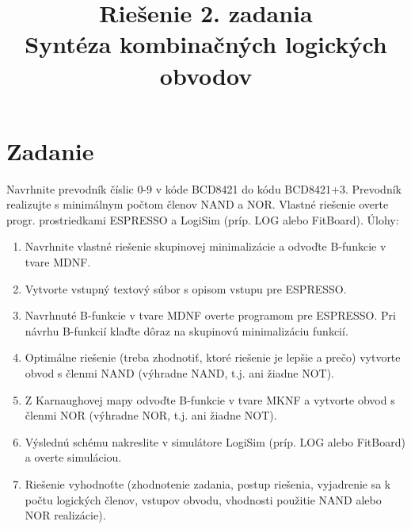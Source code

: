 \documentclass{article}
\author{}
\date{}
\title{Riešenie 2. zadania\\Syntéza kombinačných logických obvodov}
\begin{document}
\maketitle
\thispagestyle{fancy}
\section{Zadanie}
Navrhnite prevodník číslic  0-9 v kóde BCD8421 do kódu BCD8421+3. Prevodník realizujte s 
minimálnym počtom členov NAND a NOR. Vlastné  riešenie overte  progr. prostriedkami ESPRESSO a 
LogiSim (príp. LOG alebo FitBoard). 
Úlohy:
\begin{enumerate}
\item Navrhnite vlastné riešenie skupinovej minimalizácie
 a odvoďte B-funkcie v tvare MDNF.
\item Vytvorte vstupný textový súbor s opisom vstupu pre ESPRESSO.
\item Navrhnuté B-funkcie v tvare MDNF overte programom pre ESPRESSO. Pri návrhu 
B-funkcií klaďte dôraz na skupinovú minimalizáciu funkcií.
\item Optimálne riešenie (treba zhodnotiť, ktoré riešenie
je lepšie a prečo) vytvorte obvod s členmi NAND (výhradne NAND, t.j. ani žiadne NOT).
\item Z Karnaughovej mapy odvoďte B-funkcie v tvare MKNF 
a vytvorte obvod s členmi NOR (výhradne NOR, t.j. ani žiadne NOT). 
\item Výslednú schému nakreslite v simulátore LogiSim (príp. LOG alebo FitBoard) 
a overte simuláciou. 
\item Riešenie vyhodnoťte (zhodnotenie zadania, postup riešenia, vyjadrenie sa k počtu 
logických členov, vstupov obvodu, vhodnosti použitie NAND alebo NOR realizácie). 
\end{enumerate}
\pagebreak
\end{document}
